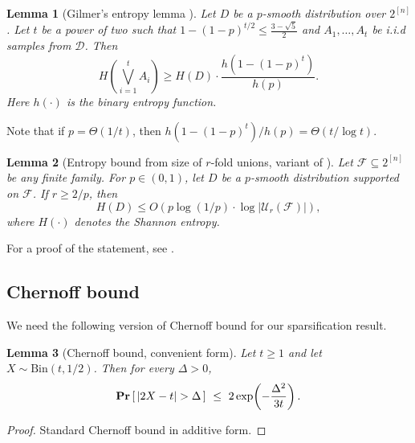 \documentclass{article}
\newtheorem{lemma}[lemma]{Lemma}
\renewcommand{\Pr}{\mathop{\bf Pr\/}}
\newcommand{\<}{\langle}
\renewcommand{\>}{\rangle}
\newcommand{\calD}{\mathcal{D}}
\newcommand{\calF}{\mathcal{F}}
\newcommand{\calU}{\mathcal{U}}
\begin{document}
\begin{lemma}[Gilmer's entropy lemma {\cite[Corollary 4.9]{BG25}}]\label{lemma:entropy_lemma} Let $D$ be a $p$-smooth distribution over $2^{[n]}$. Let $t$ be a power of two such that $1 - (1-p)^{t/2} \leq \frac{3-\sqrt{5}}{2}$ and $A_1,\ldots,A_t$ be i.i.d samples from $\calD$. Then
\[
H \left(\bigvee_{i=1}^t A_i \right) \geq H(D) \cdot \frac{h(1 - (1-p)^t)}{h(p)}.
\]    
Here $h(\cdot)$ is the binary entropy function.
\end{lemma}
Note that if $p = \Theta (1 / t)$, then $h(1- (1-p)^t) / h(p) = \Theta( t / \log t )$.

\begin{lemma}[Entropy bound from size of $r$-fold unions, variant of {\cite[Corollary 4.13]{BG25}}]\label{lem:entropy_bound_from_size_of_r_fold_unions}
    Let $\calF \subseteq 2^{[n]}$ be any finite family. For $p \in (0, 1)$, let $D$ be a $p$-smooth distribution supported on $\calF$. If $r \geq 2/p$, then
    \[
    H(D) \leq O ( p \log (1/p) \cdot \log |\calU_r (\calF)|),
    \]
    where $H(\cdot)$ denotes the Shannon entropy.
\end{lemma}
For a proof of the statement, see  \cite[Corollary 4.13]{BG25}.


\subsection{Chernoff bound}
We need the following version of Chernoff bound for our sparsification result.
\begin{lemma}[Chernoff bound, convenient form]\label{lem:sparsif_chernoff_v2}
Let $t\ge 1$ and let $X\sim \mathrm{Bin}(t,1/2)$. Then for every $\Delta>0$,
\[
\Pr\left[\,|2X-t|>\Delta\,\right]\ \le\ 2\exp\!\left(-\frac{\Delta^2}{3t}\right).
\]
\end{lemma}

\begin{proof}
Standard Chernoff bound in additive form.
\end{proof}
\end{document}
